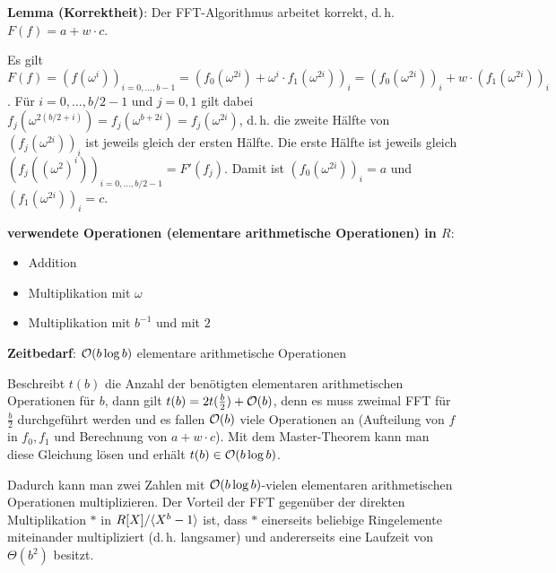 \textbf{Lemma (Korrektheit)}:
Der FFT-Algorithmus arbeitet korrekt, d.\,h. $F(f) = a + w \cdot c$.

\begin{Beweis}
    Es gilt
    $F(f)
    = (f(\omega^i))_{i=0,\dotsc,b-1}
    = (f_0(\omega^{2i}) + \omega^i \cdot f_1(\omega^{2i}))_i
    = (f_0(\omega^{2i}))_i + w \cdot (f_1(\omega^{2i}))_i$.
    Für $i = 0, \dotsc, b/2-1$ und $j = 0, 1$ gilt dabei
    $f_j(\omega^{2(b/2+i)})
    = f_j(\omega^{b+2i})
    = f_j(\omega^{2i})$, d.\,h. die zweite Hälfte von $(f_j(\omega^{2i}))_i$ ist
    jeweils gleich der ersten Hälfte.
    Die erste Hälfte ist jeweils gleich $(f_j((\omega^2)^i))_{i=0,\dotsc,b/2-1} = F'(f_j)$.
    Damit ist $(f_0(\omega^{2i}))_i = a$ und $(f_1(\omega^{2i}))_i = c$.
\end{Beweis}

\linie

\textbf{verwendete Operationen (elementare arithmetische Operationen) in $R$}:
\begin{itemize}
    \item
    Addition

    \item
    Multiplikation mit $\omega$

    \item
    Multiplikation mit $b^{-1}$ und mit $2$
\end{itemize}

\textbf{Zeitbedarf}:
$\mathcal{O}(b \log b)$ elementare arithmetische Operationen

\begin{Beweis}
    Beschreibt $t(b)$ die Anzahl der benötigten elementaren arithmetischen Operationen für $b$,
    dann gilt $t(b) = 2t(\frac{b}{2}) + \mathcal{O}(b)$,
    denn es muss zweimal FFT für $\frac{b}{2}$ durchgeführt werden und es
    fallen $\mathcal{O}(b)$ viele Operationen an (Aufteilung von $f$ in $f_0, f_1$ und
    Berechnung von $a + w \cdot c$).
    Mit dem Master-Theorem kann man diese Gleichung lösen und erhält
    $t(b) \in \mathcal{O}(b \log b)$.
\end{Beweis}

Dadurch kann man zwei Zahlen mit $\mathcal{O}(b \log b)$-vielen elementaren arithmetischen Operationen
multiplizieren.
Der Vorteil der FFT gegenüber der direkten Multiplikation $\ast$ in $R[X]/\langle X^b - 1\rangle$ ist,
dass $\ast$ einerseits beliebige Ringelemente miteinander multipliziert (d.\,h. langsamer)
und andererseits eine Laufzeit von $\Theta(b^2)$ besitzt.

\pagebreak

